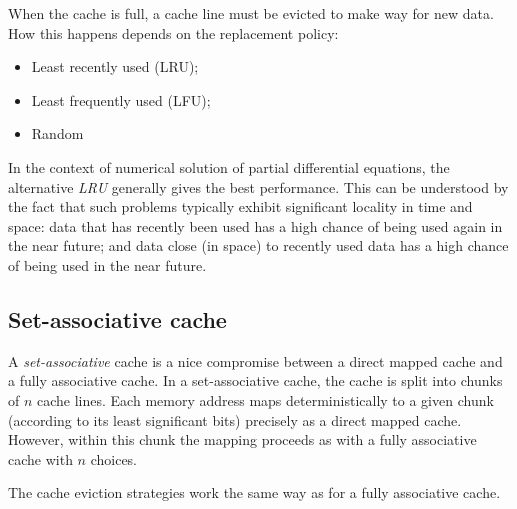 When the cache is full, a cache line must be evicted to make way for new data.
How this happens depends on the replacement policy:
\begin{itemize}
\item Least recently used (LRU);
\item Least frequently used (LFU);
\item Random
\end{itemize}
In the context of numerical solution of partial differential equations, the
alternative \emph{LRU} generally gives the best performance. This can be
understood by the fact that such problems typically exhibit significant locality
in time and space: data that has recently been used has a high chance of being
used again in the near future; and data close (in space) to recently used data
has a high chance of being used in the near future.

\subsection{Set-associative cache}

A \emph{set-associative} cache is a nice compromise between a direct mapped
cache and a fully associative cache. In a set-associative cache, the cache is
split into chunks of $n$ cache lines. Each memory address maps deterministically
to a given chunk (according to its least significant bits) precisely as a direct
mapped cache. However, within this chunk the mapping proceeds as with a fully
associative cache with $n$ choices.

The cache eviction strategies work the same way as for a fully associative
cache.
